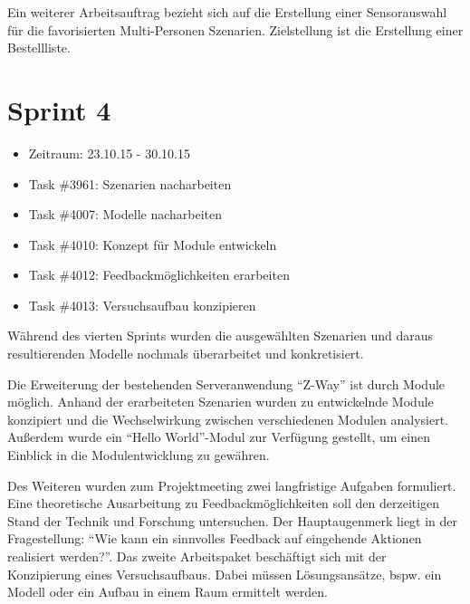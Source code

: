 \documentclass[12pt, oneside, smallheadings]{scrbook}
\begin{document}
Ein weiterer Arbeitsauftrag bezieht sich auf die Erstellung einer Sensorauswahl für die favorisierten Multi-Personen Szenarien. Zielstellung ist die Erstellung einer Bestellliste.

\section{Sprint 4}
\begin{itemize}
	\item Zeitraum: 23.10.15 - 30.10.15 \newline
	\item Task \#3961: Szenarien nacharbeiten
	\item Task \#4007: Modelle nacharbeiten
	\item Task \#4010: Konzept für Module entwickeln
	\item Task \#4012: Feedbackmöglichkeiten erarbeiten
	\item Task \#4013: Versuchsaufbau konzipieren\\
\end{itemize}
\noindent
Während des vierten Sprints wurden die ausgewählten Szenarien und daraus resultierenden Modelle nochmals überarbeitet und konkretisiert.

Die Erweiterung der bestehenden Serveranwendung "`Z-Way"' ist durch Module möglich. Anhand der erarbeiteten Szenarien wurden zu entwickelnde Module konzipiert und die Wechselwirkung zwischen verschiedenen Modulen analysiert. Außerdem wurde ein "`Hello World"'-Modul zur Verfügung gestellt, um einen Einblick in die Modulentwicklung zu gewähren.

Des Weiteren wurden zum Projektmeeting zwei langfristige Aufgaben formuliert. Eine theoretische Ausarbeitung zu Feedbackmöglichkeiten soll den derzeitigen Stand der Technik und Forschung untersuchen. Der Hauptaugenmerk liegt in der Fragestellung: "`Wie kann ein sinnvolles Feedback auf eingehende Aktionen realisiert werden?"'. Das zweite Arbeitspaket beschäftigt sich mit der Konzipierung eines Versuchsaufbaus. Dabei müssen Lösungsansätze, bspw. ein Modell oder ein Aufbau in einem Raum ermittelt werden.
\end{document}
